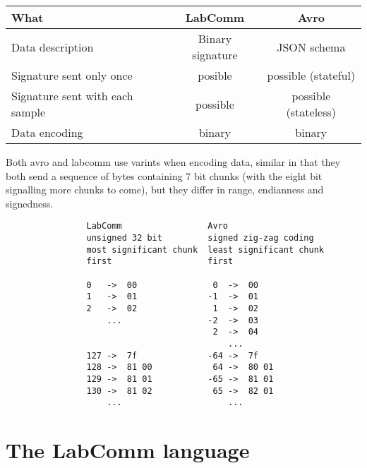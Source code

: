 \documentclass[a4paper]{article}
\begin{document}
\begin{tabular}{|l|c|c|}
  \hline
  What & LabComm & Avro \\ \hline
  Data description & Binary signature & JSON schema \\
  Signature sent only once & posible & possible (stateful) \\
  Signature sent with each sample & possible & possible (stateless) \\
  Data encoding & binary & binary \\
  \hline
\end{tabular}


Both avro and labcomm use varints when encoding data, similar in that
they both send a sequence of bytes containing 7 bit chunks (with the
eight bit signalling more chunks to come), but they differ in range,
endianness and signedness.

\begin{verbatim}
                LabComm                 Avro
                unsigned 32 bit         signed zig-zag coding
                most significant chunk  least significant chunk
                first                   first

                0   ->  00               0  ->  00
                1   ->  01              -1  ->  01
                2   ->  02               1  ->  02
                    ...                 -2  ->  03
                                         2  ->  04
                                            ...
                127 ->  7f              -64 ->  7f
                128 ->  81 00            64 ->  80 01
                129 ->  81 01           -65 ->  81 01
                130 ->  81 02            65 ->  82 01
                    ...                     ...   
\end{verbatim}

{}


\appendix
\newpage

\section{The LabComm language}
\label{sec:LanguageGrammar}
\end{document}
